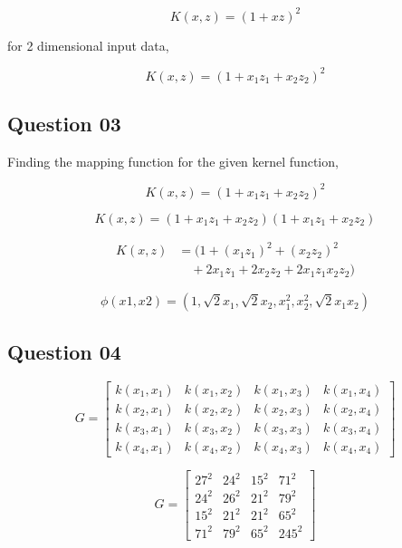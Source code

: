 \documentclass[11pt,a4paper]{article}
\begin{document}
\begin{equation}
    K(x,z) =  (1 + xz)^2   
\end{equation}

for 2 dimensional input data,

\begin{equation}
    K(x,z) =  (1 + x_1z_1 + x_2z_2)^2   
\end{equation}

\subsection{Question 03}

Finding the mapping function for the given kernel function,

\begin{equation}
    K(x,z) =  (1 + x_1z_1 + x_2z_2)^2 
\end{equation}

\begin{equation}
    K(x,z) =  (1 + x_1z_1 + x_2z_2)(1 + x_1z_1 + x_2z_2)
\end{equation}

\begin{align}
    K(x,z) &=  (1 + (x_1z_1)^2 + (x_2z_2)^2 \nonumber \\
    &\quad + 2x_1z_1 + 2x_2z_2 + 2x_1z_1x_2z_2)
\end{align}

\begin{equation}
    \phi(x1,x2) =  (1,\sqrt{2}x_1,\sqrt{2}x_2,x_1^2,x_2^2,\sqrt{2}x_1x_2)
\end{equation}


\subsection{Question 04}


\begin{equation}
    G = 
    \begin{bmatrix}
        k(x_1,x_1) & k(x_1,x_2) & k(x_1,x_3) & k(x_1,x_4) \\
        k(x_2,x_1) & k(x_2,x_2) & k(x_2,x_3) & k(x_2,x_4) \\
        k(x_3,x_1) & k(x_3,x_2) & k(x_3,x_3) & k(x_3,x_4) \\
        k(x_4,x_1) & k(x_4,x_2) & k(x_4,x_3) & k(x_4,x_4) 
    \end{bmatrix}
\end{equation}

\begin{equation}
    G = 
    \begin{bmatrix}
        27^2 & 24^2 & 15^2 & 71^2 \\
        24^2 & 26^2 & 21^2 & 79^2 \\
        15^2 & 21^2 & 21^2 & 65^2 \\
        71^2 & 79^2 & 65^2 & 245^2
    \end{bmatrix}
\end{equation}
\end{document}
